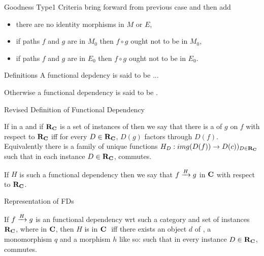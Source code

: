 \documentclass[xcolor=pst,dvips]{beamer}   %
\begin{document}
\begin{frame}{Goodness Type1 Criteria}
bring forward from previous case and then add
\begin{itemize}
    \item there are no identity morphisms in $M$ or $E$,
\item if paths $f$ and $g$ are in $M_0$ then $f \circ g$ ought not to be in $M_0$,
\item if paths $f$ and $g$ are in $E_0$ then $f \circ g$ ought not to be in $E_0$.
\end{itemize}
\end{frame}

\begin{frame}{Definitions}
A functional depdency is said to be  ...

Otherwise a functional dependency is said to be .
\end{frame}


\begin{frame}{Revised Definition of Functional Dependency}
\begin{definition}
If \scalebox{0.9}{\fgsourcediagram} in a \catMEterm \catcw  and if $\reqtc$ is a set of instances of \catcw
then we say that there is a   of $g$ on $f$ with respect to $\reqtc$ iff
for every $D \in \reqtc$, $D(g)$ factors through $D(f)$. \\
\medskip
Equivalently there is a family of unique functions $H_D:img(D(f)) \morph D(c))_{D \in \reqtc}$
such that in each instance $D \in \reqtc$,
 commutes.
\end{definition}

If $H$ is such a functional dependency then we say that $\fundep{H}{f}{g}$ in $\catc$ with respect to $\reqtc$.
\end{frame}

\begin{frame}{Representation of FDs}
\begin{definition}
If $\fundep{H}{f}{g}$ is an   functional dependency wrt such a category \catcw and set of instances $\reqtc$, 
where \scalebox{0.9}{\roomdown{0.8cm}\fgsourcediagram} in $\catc$, 
then $H$  is  in $\catcw$ 
iff there exists an object $d$ of \catc, a monomorphism $q$ and a morphism $h$
like so:
such that in every instance $D \in \reqtc$,
 commutes.
\end{definition}
\end{frame}
\end{document}
